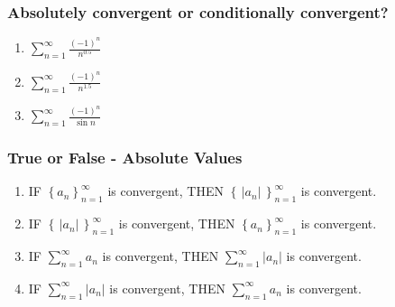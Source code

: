\documentclass[14pt]{beamer}
\begin{document}
\begin{frame}[t]
	\frametitle{Absolutely convergent or conditionally convergent?}

	\begin{enumerate}
		\item $\displaystyle \sum_{n=1}^{\infty}\frac{(-1)^{n}}{n^{0.5}}$
			\vspace{.5cm}

		\item $\displaystyle \sum_{n=1}^{\infty}\frac{(-1)^{n}}{n^{1.5}}$
			\vspace{.5cm}

		\item $\displaystyle \sum_{n=1}^{\infty}\frac{(-1)^{n}}{\sin n}$
			\vspace{.5cm}
	\end{enumerate}
\end{frame}

\begin{frame}[t]
	\fontsize{13}{13}\selectfont
	\frametitle{ True or False - Absolute Values}

	\begin{enumerate}
		\item IF {\color{blue} $\displaystyle \left\{ a_{n}\right\}_{n=1}^{\infty}$}
			is convergent, \quad THEN
			{\color{red} $\displaystyle \left\{ \, |a_{n}| \, \right\}_{n=1}^{\infty}$}
			is convergent.
			\vspace{.5cm}

		\item IF {\color{red} $\displaystyle \left\{ \, |a_{n}| \, \right\}_{n=1}^{\infty}$}
			is convergent, \quad THEN
			{\color{blue} $\displaystyle \left\{ a_{n}\right\}_{n=1}^{\infty}$} is
			convergent.
			\vspace{.5cm}

		\item IF \; {\color{blue} $\displaystyle \sum_{n=1}^{\infty}a_{n}$} \; is convergent,
			\quad THEN \; {\color{red} $\displaystyle \sum_{n=1}^{\infty}|a_{n}|$} \;
			is convergent.
			\vspace{.2cm}

		\item IF \; {\color{red} $\displaystyle \sum_{n=1}^{\infty}|a_{n}|$} \; is convergent,
			\quad THEN \; {\color{blue} $\displaystyle \sum_{n=1}^{\infty}a_{n}$} \;
			is convergent.
	\end{enumerate}
\end{frame}
\end{document}
